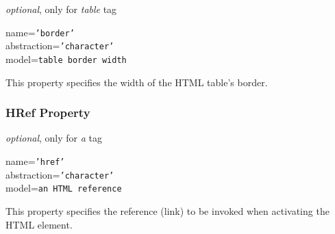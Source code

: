 \emph{optional}, only for \emph{table} tag

name=\texttt{'border'}\\
abstraction=\texttt{'character'}\\
model=\texttt{table border width}

This property specifies the width of the HTML table's border.

\subsubsection{HRef Property}

\emph{optional}, only for \emph{a} tag

name=\texttt{'href'}\\
abstraction=\texttt{'character'}\\
model=\texttt{an HTML reference}

This property specifies the reference (link) to be invoked when activating the
HTML element.
